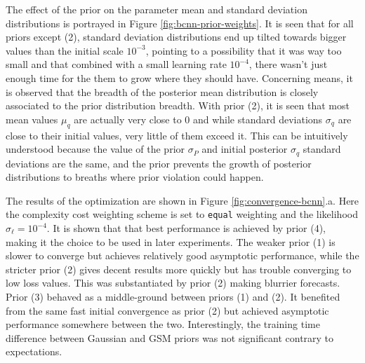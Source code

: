 The effect of the prior on the parameter mean and standard deviation distributions is portrayed in Figure \ref{fig:bcnn-prior-weights}. It is seen that for all priors except (2), standard deviation distributions end up tilted towards bigger values than the initial scale $10^{-3}$, pointing to a possibility that it was way too small and that combined with a small learning rate $10^{-4}$, there wasn't just enough time for the them to grow where they should have. Concerning means, it is observed that the breadth of the posterior mean distribution is closely associated to the prior distribution breadth. With prior (2), it is seen that most mean values $\mu_q$ are actually very close to 0 and while standard deviations $\sigma_q$ are close to their initial values, very little of them exceed it. This can be intuitively understood because the value of the prior $\sigma_P$ and initial posterior $\sigma_q$ standard deviations are the same, and the prior prevents the growth of posterior distributions to breaths where prior violation could happen. 

The results of the optimization are shown in Figure \ref{fig:convergence-bcnn}.a. Here the complexity cost weighting scheme is set to \texttt{equal} weighting and the likelihood $\sigma_\ell = 10^{-4}$. It is shown that that best performance is achieved by prior (4), making it the choice to be used in later experiments. The weaker prior (1) is slower to converge but achieves relatively good asymptotic performance, while the stricter prior (2) gives decent results more quickly but has trouble converging to low loss values. This was substantiated by prior (2) making blurrier forecasts. Prior (3) behaved as a middle-ground between priors (1) and (2). It benefited from the same fast initial convergence as prior (2) but achieved asymptotic performance somewhere between the two. Interestingly, the training time difference between Gaussian and GSM priors was not significant contrary to expectations.

